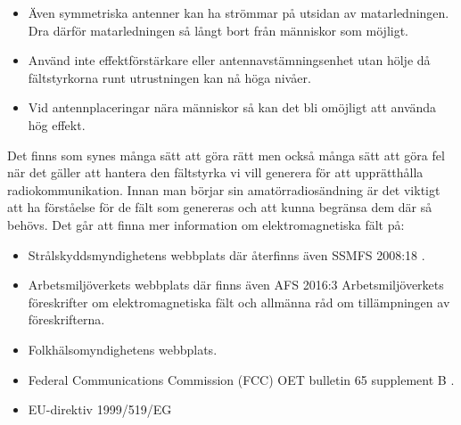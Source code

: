 \begin{itemize}
\item Även symmetriska antenner kan ha strömmar på utsidan av matarledningen.
  Dra därför matarledningen så långt bort från människor som möjligt.

\item Använd inte effektförstärkare eller antennavstämningsenhet utan
  hölje då fältstyrkorna runt utrustningen kan nå höga nivåer.

\item Vid antennplaceringar nära människor så kan det bli omöjligt att
  använda hög effekt.
\end{itemize}

Det finns som synes många sätt att göra rätt men också många sätt att göra fel
när det gäller att hantera den fältstyrka vi vill generera för att upprätthålla
radiokommunikation.
Innan man börjar sin amatörradiosändning är det viktigt att ha förståelse för
de fält som genereras och att kunna begränsa dem där så behövs.
Det går att finna mer information om elektromagnetiska fält på:

\begin{itemize}
\item Strålskyddsmyndighetens webbplats där återfinns även SSMFS 2008:18 \cite{SSMFS2008:18}.

\item Arbetsmiljöverkets webbplats där finns även AFS 2016:3 Arbetsmiljöverkets
föreskrifter om elektromagnetiska fält och allmänna råd om tillämpningen av
föreskrifterna.

\item Folkhälsomyndighetens webbplats.

\item Federal Communications Commission (FCC) OET bulletin 65 supplement B \cite{OETbul65b}.

\item EU-direktiv 1999/519/EG \cite{1999/519/EG}
\end{itemize}

